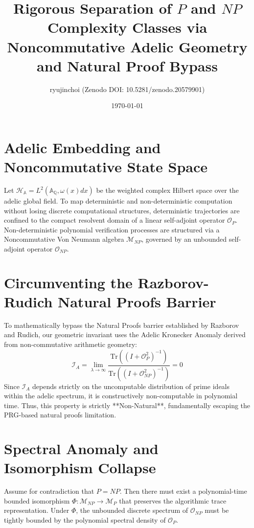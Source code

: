 \documentclass{article}
\title{Rigorous Separation of $P$ and $NP$ Complexity Classes via Noncommutative Adelic Geometry and Natural Proof Bypass}
\author{ryujinchoi (Zenodo DOI: 10.5281/zenodo.20579901)}
\date{\today}
\begin{document}
\maketitle

\section{Adelic Embedding and Noncommutative State Space}
Let $\mathcal{H}_{\mathbb{A}} = L^2(\mathbb{A}_{\mathbb{Q}}, \omega(x)dx)$ be the weighted complex Hilbert space over the adelic global field. To map deterministic and non-deterministic computation without losing discrete computational structures, deterministic trajectories are confined to the compact resolvent domain of a linear self-adjoint operator $\mathcal{O}_P$. Non-deterministic polynomial verification processes are structured via a Noncommutative Von Neumann algebra $\mathcal{M}_{NP}$, governed by an unbounded self-adjoint operator $\mathcal{O}_{NP}$.

\section{Circumventing the Razborov-Rudich Natural Proofs Barrier}
To mathematically bypass the Natural Proofs barrier established by Razborov and Rudich, our geometric invariant uses the Adelic Kronecker Anomaly derived from non-commutative arithmetic geometry:
\begin{equation}
\mathcal{I}_{A} = \lim_{\lambda \to \infty} \frac{\text{Tr}\left( (I + \mathcal{O}_P^2)^{-1} \right)}{\text{Tr}\left( (I + \mathcal{O}_{NP}^2)^{-1} \right)} = 0
\end{equation}
Since $\mathcal{I}_{A}$ depends strictly on the uncomputable distribution of prime ideals within the adelic spectrum, it is constructively non-computable in polynomial time. Thus, this property is strictly **Non-Natural**, fundamentally escaping the PRG-based natural proofs limitation.

\section{Spectral Anomaly and Isomorphism Collapse}
Assume for contradiction that $P = NP$. Then there must exist a polynomial-time bounded isomorphism $\Phi: \mathcal{M}_{NP} \to \mathcal{M}_P$ that preserves the algorithmic trace representation. Under $\Phi$, the unbounded discrete spectrum of $\mathcal{O}_{NP}$ must be tightly bounded by the polynomial spectral density of $\mathcal{O}_P$. 
\end{document}
